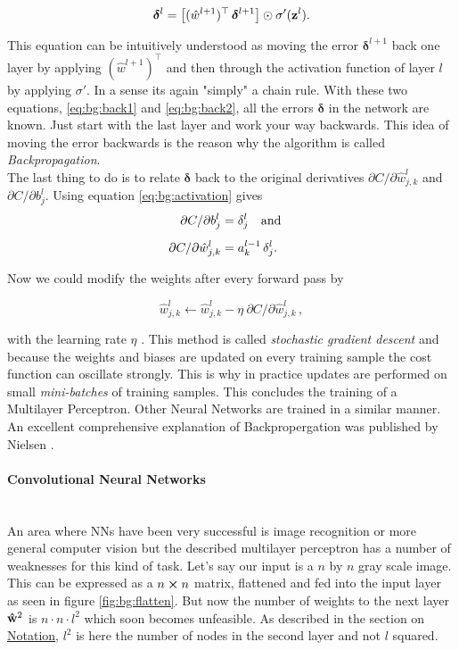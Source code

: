 \begin{equation} \label{eq:bg:back2}
    \boldsymbol \delta^l =
    \qty[(\hat w^{l+1})^\top \, \boldsymbol \delta^{l+1}]
    \odot \sigma'(\vb z^l).
\end{equation}

This equation can be intuitively understood as moving the error
$\boldsymbol \delta^{l+1}$ back one layer by applying $(\hat w^{l+1})^\top$ and then through the activation function of layer $l$ by applying $\sigma'$. In a sense its again "simply" a chain rule. With these two equations, \eqref{eq:bg:back1} and \eqref{eq:bg:back2}, all the errors $\boldsymbol \delta$ in the network are known. Just start with the last layer and work your way backwards. This idea of moving the error backwards is the reason why the algorithm is called \textit{Backpropagation}. \\

\indent
The last thing to do is to relate $\boldsymbol \delta$ back to the original derivatives $\partial C / \partial \hat w^l_{j,k}$ and $\partial C / \partial b^l_j$. Using equation \eqref{eq:bg:activation} gives
\begin{align}
    \partial C / \partial b^l_j &= \delta^l_j \qq{and} \\[5pt]
    \partial C / \partial \hat w^l_{j,k} &= a^{l-1}_k \, \delta^l_j.
\end{align}

Now we could modify the weights after every forward pass by

\begin{equation}
    \hat w^l_{j,k} \leftarrow 
    \hat w^l_{j,k} - \eta \  \partial C / \partial \hat w^l_{j,k} \,,
\end{equation}

with the learning rate $\eta$ \label{hyp:learnigrate}.
This method is called \textit{stochastic gradient descent} and because the weights and biases are updated on every training sample the cost function can oscillate strongly. 
This is why in practice updates are performed on small \textit{mini-batches}\label{hyp:minibatch} of training samples. This concludes the training of a Multilayer Perceptron. Other Neural Networks are trained in a similar manner. An excellent comprehensive explanation of Backpropergation was published by Nielsen \cite{backprop}.

\paragraph{Convolutional Neural Networks}~\\
An area where NNs have been very successful is image recognition or more general computer vision but the described multilayer perceptron has a number of weaknesses for this kind of task. Let's say our input is a $n$ by $n$ gray scale image. This can be expressed as a $n \cp n$ matrix, flattened and fed into the input layer as seen in figure \ref{fig:bg:flatten}. But now the number of weights to the next layer $\vu{w}^2$ is $n \cdot n \cdot l^2$
which soon becomes unfeasible. As described in the section on \hyperref[sec:notation]{Notation}, $l^2$ is here the number of nodes in the second layer and not $l$ squared.

